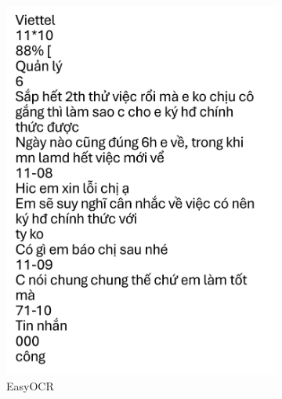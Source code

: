 \documentclass[11pt]{article}
\begin{document}
\begin{figure}[h!]
\begin{subfigure}{0.3\linewidth}
        \includegraphics[width=\linewidth]{Picture3.png}
        \caption{EasyOCR}
    \end{subfigure}
    \hfill
    \begin{subfigure}{0.3\linewidth}

\end{subfigure}
\end{figure}
\end{document}
